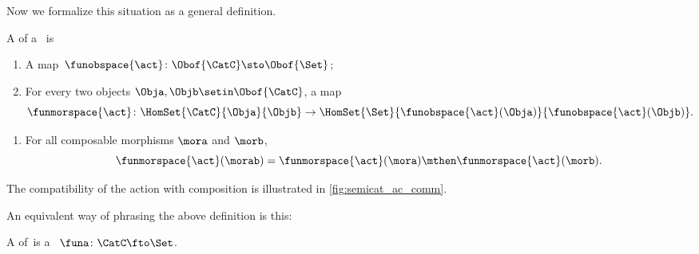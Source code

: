 {Now we formalize this situation as a general definition.

\begin{ctdefinition}
    \label{def:semicategory-action}
    A  of a ~\CatC is

    \constit
    \begin{enumerate}
        \item A map~$\funobspace{\act} \colon \Obof{\CatC} \sto \Obof{\Set}$;
        \item For every two objects $\Obja, \Objb \setin \Obof{\CatC}$, a map
              \begin{equation}
                  \funmorspace{\act} \colon \HomSet{\CatC}{\Obja}{\Objb} \to \HomSet{\Set}{ \funobspace{\act}(\Obja)}{\funobspace{\act}(\Objb)}.
              \end{equation}
    \end{enumerate}

    \condit

    \begin{enumerate}
        \item For all composable morphisms $\mora$ and $\morb$,
              \begin{equation}
                  \funmorspace{\act}(\morab) = \funmorspace{\act}(\mora) \mthen \funmorspace{\act}(\morb).
              \end{equation}
    \end{enumerate}
\end{ctdefinition}

The compatibility of the action with composition is illustrated in \cref{fig:semicat_ac_comm}.

\begin{marginfigure}
    \centering
    \caption{}
    \label{fig:semicat_ac_comm}
\end{marginfigure}

An equivalent way of phrasing the above definition is this: 

\begin{ctdefinition}\label{def:semicat-action-redefined}
    A  of~\CatC is a ~$\funa\colon \CatC \fto \Set$.
\end{ctdefinition}


}
